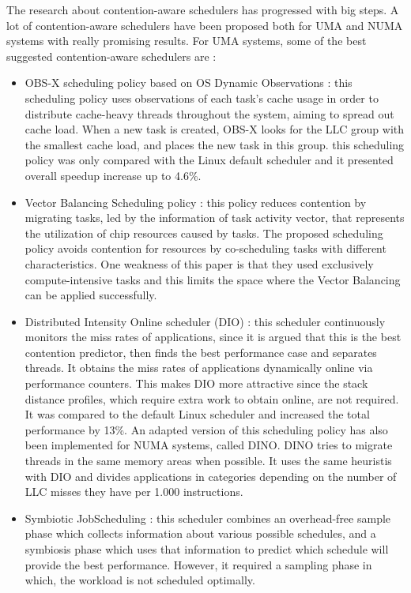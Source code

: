 \documentclass[diploma]{Styles/softlab-thesis}
\begin{document}
The research about contention-aware schedulers has progressed with big steps. A lot of contention-aware schedulers have been proposed both for UMA and NUMA systems with really promising results. For UMA systems, some of the best suggested contention-aware schedulers are :
\begin{itemize}
    \item OBS-X scheduling policy based on OS Dynamic Observations \cite{reference21}: this scheduling policy uses observations of each task's cache usage in order to distribute cache-heavy threads throughout the system, aiming to spread out cache load. When a new task is created, OBS-X looks for the LLC group with the smallest cache load, and places the new task in this group. this scheduling policy was only compared with the Linux default scheduler and it presented overall speedup increase up to 4.6\%. \\
    \item Vector Balancing Scheduling policy \cite{reference22}: this policy reduces contention by migrating tasks, led by the information of task activity vector, that represents the utilization of chip resources caused by tasks. The proposed scheduling policy avoids contention for resources by co-scheduling tasks with different characteristics. One weakness of this paper is that they used exclusively compute-intensive tasks and this limits the space where the Vector Balancing can be applied successfully. \\
    \item Distributed Intensity Online scheduler (DIO) \cite{reference23}: this scheduler continuously monitors the miss rates of applications, since it is argued that this is the best contention predictor, then finds the best performance case and separates threads. It obtains the miss rates of applications dynamically online via performance counters. This makes DIO more attractive since the stack distance profiles, which require extra work to obtain online, are not required. It was compared to the default Linux scheduler and increased the total performance by 13\%. An adapted version of this scheduling policy has also been implemented for NUMA systems, called DINO. DINO tries to migrate threads in the same memory areas when possible. It uses the same heuristis with DIO and divides applications in categories depending on the number of LLC misses they have per 1.000 instructions. \\
    \item Symbiotic JobScheduling \cite{reference19} : this scheduler combines an overhead-free sample phase which collects information about various possible schedules, and a symbiosis phase which uses that information to predict which schedule will provide the best performance. However, it required a sampling phase in which, the workload is not scheduled optimally. \\

\end{itemize}
\end{document}
